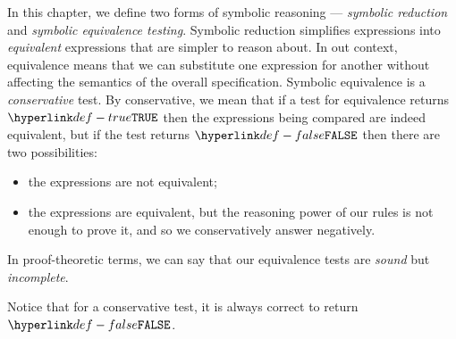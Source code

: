 \documentclass{book}
\begin{document}
In this chapter, we define two forms of symbolic reasoning ---
\emph{symbolic reduction} and \emph{symbolic equivalence testing}.
Symbolic reduction simplifies expressions into \emph{equivalent} expressions
that are simpler to reason about.
In out context, equivalence means that we can substitute one expression for another without
affecting the semantics of the overall specification.
%
Symbolic equivalence is a \emph{conservative} test.
By conservative, we mean that if a test for equivalence returns $\True$ then the expressions
being compared are indeed equivalent, but if the test returns $\False$ then
there are two possibilities:
\begin{itemize}
  \item the expressions are not equivalent;
  \item the expressions are equivalent, but the reasoning power of our rules
  is not enough to prove it, and so we conservatively answer negatively.
\end{itemize}
In proof-theoretic terms, we can say that our equivalence tests are \emph{sound} but \emph{incomplete}.

Notice that for a conservative test, it is always correct to return $\False$.
\end{document}
